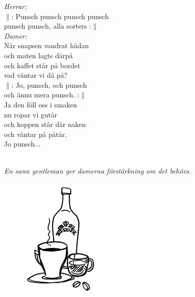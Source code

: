 \documentclass[a6paper, 10pt, twoside]{article}
\begin{document}
\noindent
\begin{center}
\end{center}
\begin{lyrics}
\textit{Herrar:}
\vspace{4pt}\\
$\|$: Punsch punsch punsch punsch\\
punsch punsch, alla sorters :$\|$
\vspace{5pt}\\
\textit{Damer:}
\vspace{4pt}\\
När snapsen vandrat hädan\\
och maten lagts därpå\\
och kaffet står på bordet\\
vad väntar vi då på?
\vspace{5pt}\\
$\|$: Jo, punsch, och punsch\\
och ännu mera punsch. :$\|$
\vspace{5pt}\\
Ja den föll oss i smaken \\
nu ropar vi gutår\\
och koppen står där naken\\
och väntar på påtår.
\vspace{5pt}\\
Jo punsch...
\end{lyrics}
\vspace{10pt}\\
\textit{En sann gentleman ger damerna förstärkning om det behövs.}
\begin{figure}[!h]
\centering
\includegraphics[width=0.35\textwidth]{kaffe.jpg}
\end{figure}
\end{document}
